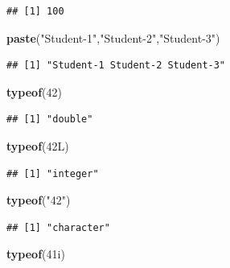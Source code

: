 \documentclass[
]{article}
\newenvironment{Shaded}{\begin{snugshade}}{\end{snugshade}}
\newcommand{\DataTypeTok}[1]{\textcolor[rgb]{0.13,0.29,0.53}{#1}}
\newcommand{\DecValTok}[1]{\textcolor[rgb]{0.00,0.00,0.81}{#1}}
\newcommand{\FunctionTok}[1]{\textcolor[rgb]{0.13,0.29,0.53}{\textbf{#1}}}
\newcommand{\NormalTok}[1]{#1}
\newcommand{\StringTok}[1]{\textcolor[rgb]{0.31,0.60,0.02}{#1}}
\begin{document}
\begin{verbatim}
## [1] 100
\end{verbatim}

\begin{Shaded}
\begin{Highlighting}[]
\FunctionTok{paste}\NormalTok{(}\StringTok{"Student{-}1"}\NormalTok{,}\StringTok{"Student{-}2"}\NormalTok{,}\StringTok{"Student{-}3"}\NormalTok{)}
\end{Highlighting}
\end{Shaded}

\begin{verbatim}
## [1] "Student-1 Student-2 Student-3"
\end{verbatim}

\begin{Shaded}
\begin{Highlighting}[]
\FunctionTok{typeof}\NormalTok{(}\DecValTok{42}\NormalTok{)}
\end{Highlighting}
\end{Shaded}

\begin{verbatim}
## [1] "double"
\end{verbatim}

\begin{Shaded}
\begin{Highlighting}[]
\FunctionTok{typeof}\NormalTok{(}\DecValTok{42}\DataTypeTok{L}\NormalTok{)}
\end{Highlighting}
\end{Shaded}

\begin{verbatim}
## [1] "integer"
\end{verbatim}

\begin{Shaded}
\begin{Highlighting}[]
\FunctionTok{typeof}\NormalTok{(}\StringTok{"42"}\NormalTok{)}
\end{Highlighting}
\end{Shaded}

\begin{verbatim}
## [1] "character"
\end{verbatim}

\begin{Shaded}
\begin{Highlighting}[]
\FunctionTok{typeof}\NormalTok{(}\DecValTok{41}\DataTypeTok{i}\NormalTok{)}
\end{Highlighting}
\end{Shaded}
\end{document}
